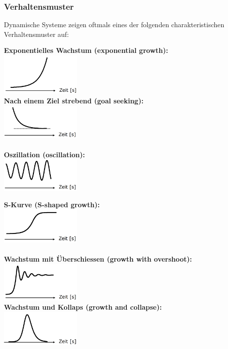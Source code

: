 \subsubsection{Verhaltensmuster}
Dynamische Systeme zeigen oftmals eines der folgenden charakteristischen Verhaltensmuster auf:
\begin{multicols}{3}
	\textbf{Exponentielles Wachstum (exponential growth):} \\
	\includegraphics[width=0.3\textwidth]{pictures/verhalten_1} \\
	\textbf{Nach einem Ziel strebend (goal seeking):} \\
	\includegraphics[width=0.3\textwidth]{pictures/verhalten_2} \\ \\
	\textbf{Oszillation (oscillation):} \\
	\includegraphics[width=0.3\textwidth]{pictures/verhalten_3}
\end{multicols}	
\begin{multicols}{3}
	\textbf{S-Kurve (S-shaped growth):} \\
	\includegraphics[width=0.3\textwidth]{pictures/verhalten_4} \\ \\
	\textbf{Wachstum mit Überschiessen (growth with overshoot):} \\
	\includegraphics[width=0.3\textwidth]{pictures/verhalten_5} \\
	\textbf{Wachstum und Kollaps (growth and collapse):} \\
	\includegraphics[width=0.3\textwidth]{pictures/verhalten_6} 
\end{multicols}	

